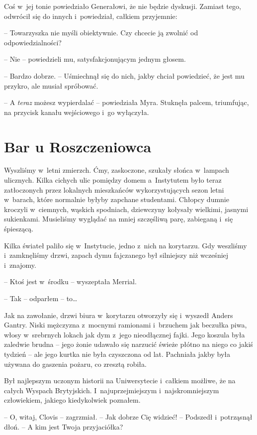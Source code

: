 \documentclass[oneside,polish,11pt,sfheadings]{mwbk}
\begin{document}
Coś w~jej tonie powiedziało Generałowi, że nie będzie dyskusji. Zamiast
tego, odwrócił się do innych i~powiedział, całkiem przyjemnie: 

-- Towarzyszka nie myśli obiektywnie. Czy chcecie ją zwolnić od
odpowiedzialności?

-- Nie -- powiedzieli mu, satysfakcjonującym jednym głosem.

-- Bardzo dobrze. -- Uśmiechnął się do nich, jakby chciał powiedzieć, że
jest mu przykro, ale musiał spróbować.

-- A \textit{teraz }możesz wypierdalać -- powiedziała Myra. Stuknęła palcem,
triumfując, na przycisk kanału wejściowego i~go wyłączyła.

\chapter{Bar u Roszczeniowca}

Wyszliśmy w~letni zmierzch. Ćmy, zaskoczone, szukały słońca w~lampach
ulicznych. Kilka cichych ulic pomiędzy domem a~Instytutem było teraz
zatłoczonych przez lokalnych mieszkańców wykorzystujących sezon letni w~barach, które normalnie byłyby zapchane studentami. Chłopcy dumnie
kroczyli w~ciemnych, wąskich spodniach, dziewczyny kołysały wielkimi,
jasnymi sukienkami. Musieliśmy wyglądać na mniej szczęśliwą parę,
zabieganą i~się śpieszącą.

Kilka świateł paliło się w~Instytucie, jedno z~nich na korytarzu. Gdy
weszliśmy i~zamknęliśmy drzwi, zapach dymu fajczanego był silniejszy niż
wcześniej i~znajomy.

-- Ktoś jest w~środku -- wyszeptała Merrial.

-- Tak -- odparłem -- to\ldots

Jak na zawołanie, drzwi biura w~korytarzu otworzyły się i~wyszedł Anders
Gantry. Niski mężczyzna z~mocnymi ramionami i~brzuchem jak beczułka
piwa, włosy w~srebrnych lokach jak dym z~jego nieodłącznej fajki. Jego
koszula była zaledwie brudna -- jego żonie udawało się narzucić świeże
płótno na niego co jakiś tydzień -- ale jego kurtka nie była czyszczona
od lat. Pachniała jakby była używana do gaszenia pożaru, co zresztą
robiła.

Był najlepszym uczonym historii na Uniwersytecie i~całkiem możliwe, że
na całych Wyspach Brytyjskich. I~najuprzejmiejszym i~najskromniejszym
człowiekiem, jakiego kiedykolwiek poznałem.

-- O, witaj, Clovis -- zagrzmiał. -- Jak dobrze Cię widzieć! -- Podszedł i~potrząsnął dłoń. -- A kim jest Twoja przyjaciółka?
\end{document}
